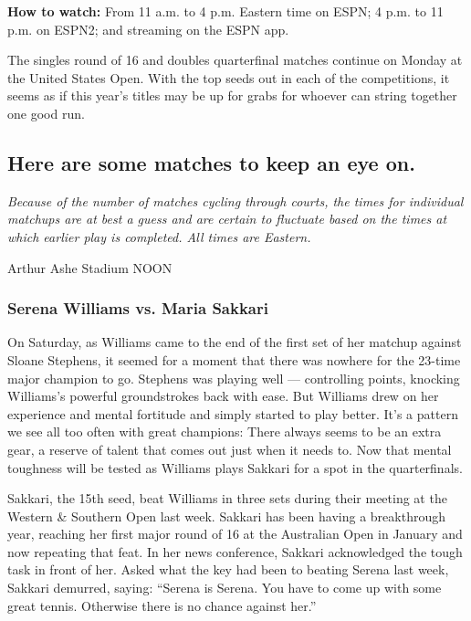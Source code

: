 \textbf{How to watch:} From 11 a.m. to 4 p.m. Eastern time on ESPN; 4
p.m. to 11 p.m. on ESPN2; and streaming on the ESPN app.

The singles round of 16 and doubles quarterfinal matches continue on
Monday at the United States Open. With the top seeds out in each of the
competitions, it seems as if this year's titles may be up for grabs for
whoever can string together one good run.

\hypertarget{here-are-some-matches-to-keep-an-eye-on}{%
\subsection{Here are some matches to keep an eye
on.}\label{here-are-some-matches-to-keep-an-eye-on}}

\emph{Because of the number of matches cycling through courts, the times
for individual matchups are at best a guess and are certain to fluctuate
based on the times at which earlier play is completed. All times are
Eastern.}

Arthur Ashe Stadium \textbar{} NOON

\hypertarget{serena-williams-vs-maria-sakkari}{%
\subsubsection{\texorpdfstring{\textbf{Serena Williams vs. Maria
Sakkari}}{Serena Williams vs. Maria Sakkari}}\label{serena-williams-vs-maria-sakkari}}

On Saturday, as Williams came to the end of the first set of her matchup
against Sloane Stephens, it seemed for a moment that there was nowhere
for the 23-time major champion to go. Stephens was playing well ---
controlling points, knocking Williams's powerful groundstrokes back with
ease. But Williams drew on her experience and mental fortitude and
simply started to play better. It's a pattern we see all too often with
great champions: There always seems to be an extra gear, a reserve of
talent that comes out just when it needs to. Now that mental toughness
will be tested as Williams plays Sakkari for a spot in the
quarterfinals.

Sakkari, the 15th seed, beat Williams in three sets during their meeting
at the Western \& Southern Open last week. Sakkari has been having a
breakthrough year, reaching her first major round of 16 at the
Australian Open in January and now repeating that feat. In her news
conference, Sakkari acknowledged the tough task in front of her. Asked
what the key had been to beating Serena last week, Sakkari demurred,
saying: ``Serena is Serena. You have to come up with some great tennis.
Otherwise there is no chance against her.''

